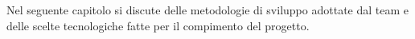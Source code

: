 Nel seguente capitolo si discute delle metodologie di sviluppo adottate dal team e delle scelte tecnologiche fatte per il compimento del progetto.
